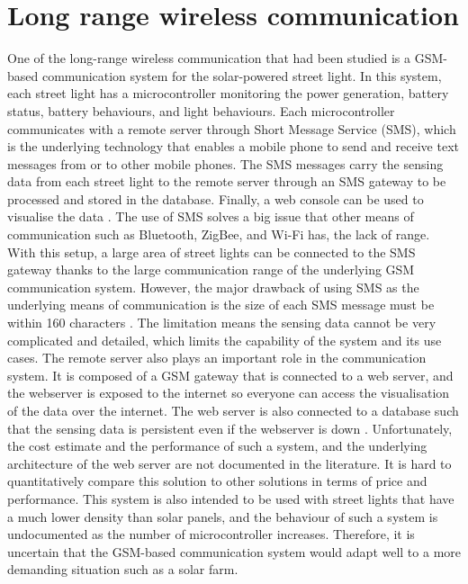 \documentclass[../thesis.tex]{subfiles}
\begin{document}
\section{Long range wireless communication}

One of the long-range wireless communication that had been studied is a GSM-based communication system for the solar-powered street light. In this system, each street light has a microcontroller monitoring the power generation, battery status, battery behaviours, and light behaviours. Each microcontroller communicates with a remote server through Short Message Service (SMS), which is the underlying technology that enables a mobile phone to send and receive text messages from or to other mobile phones. The SMS messages carry the sensing data from each street light to the remote server through an SMS gateway to be processed and stored in the database. Finally, a web console can be used to visualise the data \cite{SiregarSimon2014Spab}. The use of SMS solves a big issue that other means of communication such as Bluetooth, ZigBee, and Wi-Fi has, the lack of range. With this setup, a large area of street lights can be connected to the SMS gateway thanks to the large communication range of the underlying GSM communication system. However, the major drawback of using SMS as the underlying means of communication is the size of each SMS message must be within 160 characters \cite{etsi.org_1995}. The limitation means the sensing data cannot be very complicated and detailed, which limits the capability of the system and its use cases. The remote server also plays an important role in the communication system. It is composed of a GSM gateway that is connected to a web server, and the webserver is exposed to the internet so everyone can access the visualisation of the data over the internet. The web server is also connected to a database such that the sensing data is persistent even if the webserver is down \cite{SiregarSimon2014Spab}. Unfortunately, the cost estimate and the performance of such a system, and the underlying architecture of the web server are not documented in the literature. It is hard to quantitatively compare this solution to other solutions in terms of price and performance. This system is also intended to be used with street lights that have a much lower density than solar panels, and the behaviour of such a system is undocumented as the number of microcontroller increases. Therefore, it is uncertain that the GSM-based communication system would adapt well to a more demanding situation such as a solar farm.
\end{document}
